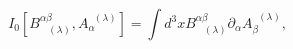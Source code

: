 \begin{equation}
I_{0}\left[ B_{\;\;\;(\lambda )}^{\alpha \beta },A_{\alpha }^{\;\;(\lambda
)}\right] =\int d^{3}xB_{\;\;\;(\lambda )}^{\alpha \beta }\partial _{\alpha
}A_{\beta }^{\;\;(\lambda )},  \label{bf31}
\end{equation}

